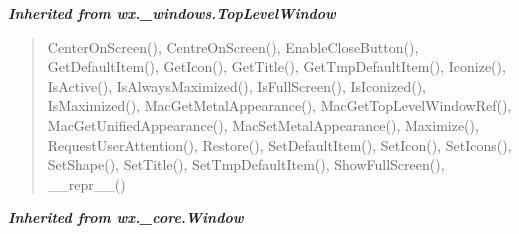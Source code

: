\large{\textbf{\textit{Inherited from wx.\_windows.TopLevelWindow}}}

\begin{quote}
CenterOnScreen(), CentreOnScreen(), EnableCloseButton(), GetDefaultItem(), GetIcon(), GetTitle(), GetTmpDefaultItem(), Iconize(), IsActive(), IsAlwaysMaximized(), IsFullScreen(), IsIconized(), IsMaximized(), MacGetMetalAppearance(), MacGetTopLevelWindowRef(), MacGetUnifiedAppearance(), MacSetMetalAppearance(), Maximize(), RequestUserAttention(), Restore(), SetDefaultItem(), SetIcon(), SetIcons(), SetShape(), SetTitle(), SetTmpDefaultItem(), ShowFullScreen(), \_\_repr\_\_()
\end{quote}

\large{\textbf{\textit{Inherited from wx.\_core.Window}}}

\begin{quote}

\end{quote}
